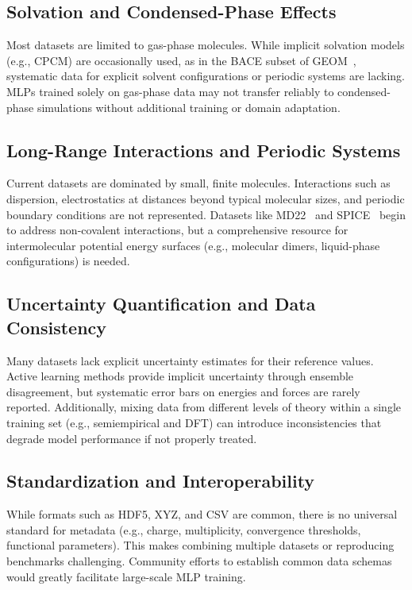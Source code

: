 \documentclass[12pt]{article}
\begin{document}
\subsection*{Solvation and Condensed-Phase Effects}
Most datasets are limited to gas-phase molecules. While implicit solvation models (e.g., CPCM) are occasionally used, as in the BACE subset of GEOM~\cite{ds34-16}, systematic data for explicit solvent configurations or periodic systems are lacking. MLPs trained solely on gas-phase data may not transfer reliably to condensed-phase simulations without additional training or domain adaptation.

\subsection*{Long-Range Interactions and Periodic Systems}
Current datasets are dominated by small, finite molecules. Interactions such as dispersion, electrostatics at distances beyond typical molecular sizes, and periodic boundary conditions are not represented. Datasets like MD22~\cite{ds22-21} and SPICE~\cite{ds12-43} begin to address non-covalent interactions, but a comprehensive resource for intermolecular potential energy surfaces (e.g., molecular dimers, liquid-phase configurations) is needed.

\subsection*{Uncertainty Quantification and Data Consistency}
Many datasets lack explicit uncertainty estimates for their reference values. Active learning methods provide implicit uncertainty through ensemble disagreement, but systematic error bars on energies and forces are rarely reported. Additionally, mixing data from different levels of theory within a single training set (e.g., semiempirical and DFT) can introduce inconsistencies that degrade model performance if not properly treated.

\subsection*{Standardization and Interoperability}
While formats such as HDF5, XYZ, and CSV are common, there is no universal standard for metadata (e.g., charge, multiplicity, convergence thresholds, functional parameters). This makes combining multiple datasets or reproducing benchmarks challenging. Community efforts to establish common data schemas would greatly facilitate large-scale MLP training.
\end{document}
